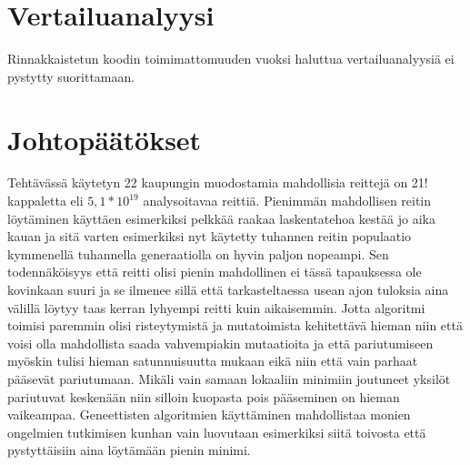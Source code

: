 \documentclass[12pt]{article}
\numberwithin{equation}{section}
\numberwithin{table}{section}
\begin{document}
\section{Vertailuanalyysi}
Rinnakkaistetun koodin toimimattomuuden vuoksi haluttua vertailuanalyysiä ei pystytty suorittamaan.

\section{Johtopäätökset}
Tehtävässä käytetyn 22 kaupungin muodostamia mahdollisia reittejä on 21! kappaletta eli $5,1*10^{19}$ analysoitavaa reittiä. Pienimmän mahdollisen reitin löytäminen käyttäen esimerkiksi pelkkää raakaa laskentatehoa kestää jo aika kauan ja sitä varten esimerkiksi nyt käytetty tuhannen reitin populaatio kymmenellä tuhannella generaatiolla on hyvin paljon nopeampi. Sen todennäköisyys että reitti olisi pienin mahdollinen ei tässä tapauksessa ole kovinkaan suuri ja se ilmenee sillä että tarkasteltaessa usean ajon tuloksia aina välillä löytyy taas kerran lyhyempi reitti kuin aikaisemmin. Jotta algoritmi toimisi paremmin olisi risteytymistä ja mutatoimista kehitettävä hieman niin että voisi olla mahdollista saada vahvempiakin mutaatioita ja että pariutumiseen myöskin tulisi hieman satunnuisuutta mukaan eikä niin että vain parhaat pääsevät pariutumaan. Mikäli vain samaan lokaaliin minimiin joutuneet yksilöt pariutuvat keskenään niin silloin kuopasta pois pääseminen on hieman vaikeampaa. Geneettisten algoritmien käyttäminen mahdollistaa monien ongelmien tutkimisen kunhan vain luovutaan esimerkiksi siitä toivosta että pystyttäisiin aina löytämään pienin minimi.
\end{document}
